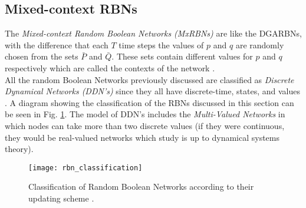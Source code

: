 \subsection{Mixed-context RBNs}
The \textit{Mixed-context Random Boolean Networks (MxRBNs)} are like the DGARBNs, with the difference that each $T$ time steps the values of $p$ and $q$ are randomly chosen from the sets $\bar{P}$ and $\bar{Q}$. These sets contain different values for $p$ and $q$ respectively which are called the contexts of the network \cite{updating_scheme2}.\\

All the random Boolean Networks previously discussed are classified as \textit{Discrete Dynamical Networks (DDN's)} since they all have discrete-time, states, and values \cite{updating_scheme1}. A diagram showing the classification of the RBNs discussed in this section can be seen in Fig. \ref{fig:rbn_classification}. The model of DDN's includes the \textit{Multi-Valued Networks} in which nodes can take more than two discrete values (if they were continuous, they would be real-valued networks which study is up to dynamical systems theory)\cite{updating_scheme1}.

\begin{figure}
	\centering
		\texttt{[image: rbn\_classification]}
	\caption[Classification of Random Boolean Networks according to their updating scheme.]{Classification of Random Boolean Networks according to their updating scheme \cite{updating_scheme1}.}
	\label{fig:rbn_classification}
\end{figure}

